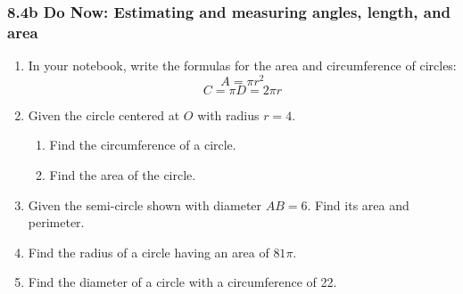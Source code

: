 \documentclass[12pt, twoside]{article}
\begin{document}
\subsubsection*{8.4b Do Now: Estimating and measuring angles, length, and area}
 \begin{enumerate}

  \item In your notebook, write the formulas for the area and circumference of circles:
\[A=\pi r^2\]
\[C=\pi D = 2\pi r\]

  \item Given the circle centered at $O$ with radius $r=4$.
  \begin{multicols}{2}
    \begin{enumerate}
      \item Find the circumference of a circle. %
      \item Find the area of the circle.\vspace{3cm}
    \end{enumerate}
  \end{multicols}

  \item Given the semi-circle shown with diameter $AB=6$. Find its area and perimeter.
    \begin{flushright}
  \end{flushright} \vspace{1cm}

  \item Find the radius of a circle having an area of $81 \pi$. \vspace{2cm}
  \item Find the diameter of a circle with a circumference of 22.


\end{enumerate}
\end{document}
